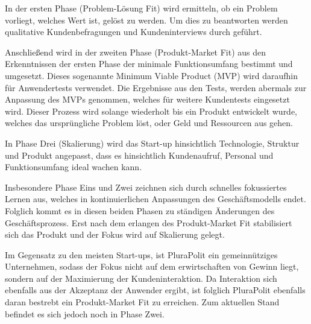 In der ersten Phase (Problem-Lösung Fit) wird ermitteln, ob ein Problem vorliegt, welches Wert ist, gelöst zu werden. Um dies zu beantworten werden qualitative Kundenbefragungen und Kundeninterviews durch geführt.

Anschließend wird in der zweiten Phase (Produkt-Market Fit)  aus den Erkenntnissen der ersten Phase der minimale Funktionsumfang bestimmt und umgesetzt. Dieses sogenannte Minimum Viable Product (MVP) wird daraufhin für Anwendertests verwendet. Die Ergebnisse aus den Tests, werden abermals zur Anpassung des MVPs genommen, welches für weitere Kundentests eingesetzt wird. Dieser Prozess wird solange wiederholt bis ein Produkt entwickelt wurde, welches das ursprüngliche Problem löst, oder Geld und Ressourcen aus gehen.

In Phase Drei (Skalierung) wird das Start-up hinsichtlich Technologie, Struktur und Produkt angepasst, dass es hinsichtlich Kundenaufruf, Personal und Funktionsumfang ideal wachen kann.

Insbesondere Phase Eins und Zwei zeichnen sich durch schnelles fokussiertes Lernen aus, welches in kontinuierlichen Anpassungen des Geschäftsmodells endet. Folglich kommt es in diesen beiden Phasen zu ständigen Änderungen des Geschäftsprozess. Erst nach dem erlangen des Produkt-Market Fit stabilisiert sich das Produkt und der Fokus wird auf Skalierung gelegt.

Im Gegensatz zu den meisten Start-ups, ist PluraPolit ein gemeinnütziges Unternehmen, sodass der Fokus nicht auf dem erwirtschaften von Gewinn liegt, sondern auf der Maximierung der Kundeninteraktion. Da Interaktion sich ebenfalls aus der Akzeptanz der Anwender ergibt, ist folglich PluraPolit ebenfalls daran bestrebt ein Produkt-Market Fit zu erreichen. Zum aktuellen Stand befindet es sich jedoch noch in Phase Zwei.
